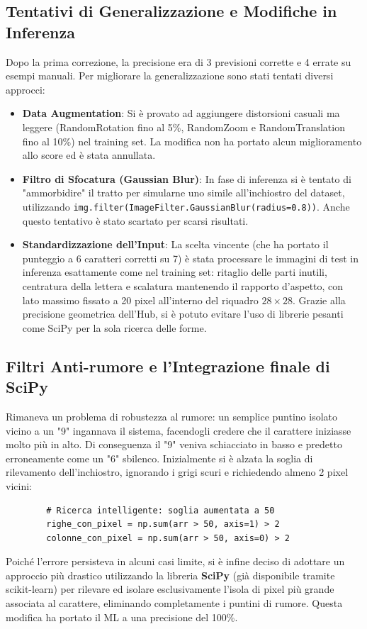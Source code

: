 \documentclass[12pt,a4paper]{article}
\begin{document}
	\subsection{Tentativi di Generalizzazione e Modifiche in Inferenza}
	Dopo la prima correzione, la precisione era di 3 previsioni corrette e 4 errate su esempi manuali. Per migliorare la generalizzazione sono stati tentati diversi approcci:
	\begin{itemize}
		\item \textbf{Data Augmentation}: Si è provato ad aggiungere distorsioni casuali ma leggere (RandomRotation fino al 5\%, RandomZoom e RandomTranslation fino al 10\%) nel training set. La modifica non ha portato alcun miglioramento allo score ed è stata annullata.
		\item \textbf{Filtro di Sfocatura (Gaussian Blur)}: In fase di inferenza si è tentato di "ammorbidire" il tratto per simularne uno simile all'inchiostro del dataset, utilizzando \texttt{img.filter(ImageFilter.GaussianBlur(radius=0.8))}. Anche questo tentativo è stato scartato per scarsi risultati.
		\item \textbf{Standardizzazione dell'Input}: La scelta vincente (che ha portato il punteggio a 6 caratteri corretti su 7) è stata processare le immagini di test in inferenza esattamente come nel training set: ritaglio delle parti inutili, centratura della lettera e scalatura mantenendo il rapporto d'aspetto, con lato massimo fissato a 20 pixel all'interno del riquadro $28\times28$. Grazie alla precisione geometrica dell'Hub, si è potuto evitare l'uso di librerie pesanti come SciPy per la sola ricerca delle forme.
	\end{itemize}

	\subsection{Filtri Anti-rumore e l'Integrazione finale di SciPy}
	Rimaneva un problema di robustezza al rumore: un semplice puntino isolato vicino a un "9" ingannava il sistema, facendogli credere che il carattere iniziasse molto più in alto. Di conseguenza il "9" veniva schiacciato in basso e predetto erroneamente come un "6" sbilenco.
	Inizialmente si è alzata la soglia di rilevamento dell'inchiostro, ignorando i grigi scuri e richiedendo almeno 2 pixel vicini:
	\begin{lstlisting}
		# Ricerca intelligente: soglia aumentata a 50
		righe_con_pixel = np.sum(arr > 50, axis=1) > 2
		colonne_con_pixel = np.sum(arr > 50, axis=0) > 2
	\end{lstlisting}
	Poiché l'errore persisteva in alcuni casi limite, si è infine deciso di adottare un approccio più drastico utilizzando la libreria \textbf{SciPy} (già disponibile tramite scikit-learn) per rilevare ed isolare esclusivamente l'isola di pixel più grande associata al carattere, eliminando completamente i puntini di rumore. Questa modifica ha portato il ML a una precisione del 100\%.
\end{document}
